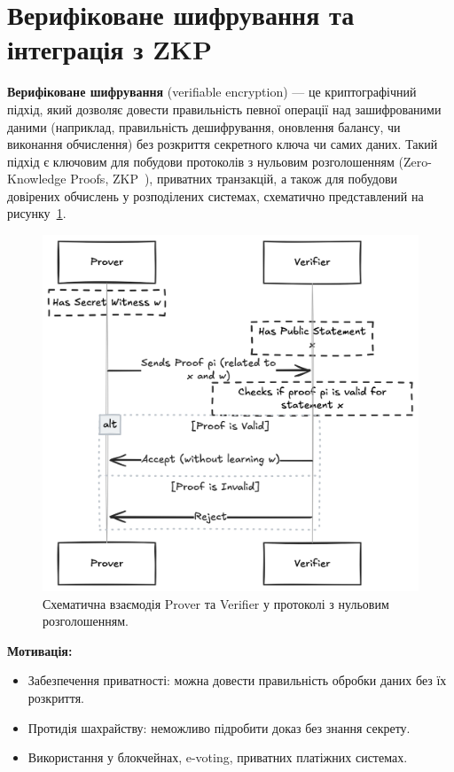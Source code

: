 \section{Верифіковане шифрування та інтеграція з ZKP}
\label{sec:verifiable_encryption}

\textbf{Верифіковане шифрування} (verifiable encryption) --- це криптографічний підхід, який дозволяє довести правильність певної операції над зашифрованими даними (наприклад, правильність дешифрування, оновлення балансу, чи виконання обчислення) без розкриття секретного ключа чи самих даних.
Такий підхід є ключовим для побудови протоколів з нульовим розголошенням (Zero-Knowledge Proofs, ZKP~\cite{zkp_origin, pinocchio}), приватних транзакцій, а також для побудови довірених обчислень у розподілених системах, схематично представлений на рисунку~\ref{fig:zkp_interaction}.

\begin{figure}[ht]
    \centering
    \includegraphics[width=0.4\textheight,keepaspectratio]{pictures/prover-verifier-image}
    \caption{Схематична взаємодія Prover та Verifier у протоколі з нульовим розголошенням.}
    \label{fig:zkp_interaction}
\end{figure}

\textbf{Мотивація:}
\begin{itemize}
    \item Забезпечення приватності: можна довести правильність обробки даних без їх розкриття.
    \item Протидія шахрайству: неможливо підробити доказ без знання секрету.
    \item Використання у блокчейнах, e-voting, приватних платіжних системах.
\end{itemize}

